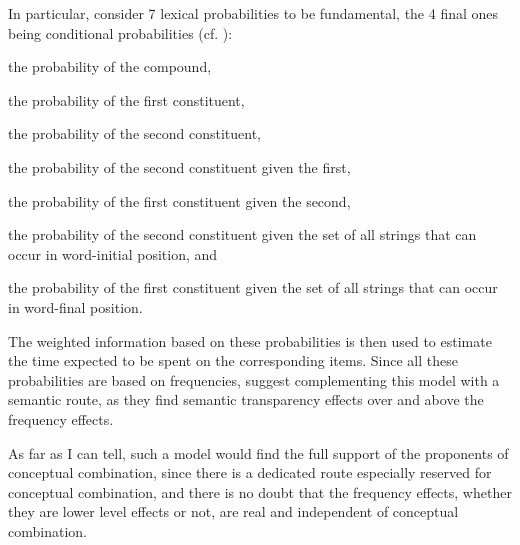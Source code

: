 In particular, \citeauthor{Kupermanetal:2009} consider 7 lexical probabilities to be
fundamental, the 4 final ones being conditional probabilities (cf. \citealt[1112--1116]{Kupermanetal:2009}):
\begin{inparaenum}[(1)]
\item the probability of the compound,
\item the probability of the first constituent,
\item the probability of the second constituent,
\item the probability of the second constituent given the first,
\item the probability of the first constituent given the second,
\item the probability of the second constituent given the set of all
  strings that can occur in word-initial position, and
\item the probability of the first constituent given the set of all
  strings that can occur in word-final position.
\end{inparaenum}
The weighted information based on these probabilities is then used to
estimate the time expected to be spent on the corresponding items. Since
all these probabilities are based on frequencies,
\citet{MarelliandLuzzatti:2012} suggest complementing this model with
a semantic route, as they find semantic transparency effects over and
above the frequency effects.  



As far as I can tell, such a model would find the full support of the
proponents of conceptual combination, since there is a dedicated route
especially reserved for conceptual combination, and there is no doubt
that the frequency effects, whether they are lower level effects or not,  are real and
independent of conceptual combination. 

